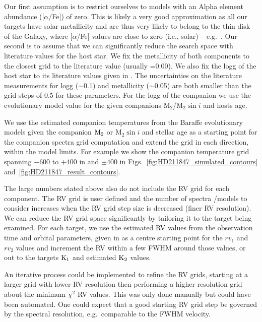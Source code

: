 Our first assumption is to restrict ourselves to models with an Alpha element abundance ([\(\alpha\)/Fe]) of zero. This is likely a very good approximation as all our targets have solar metallicity and are thus very likely to belong to the thin disk of the Galaxy, where [\(\alpha\)/Fe] values are close to zero (i.e., solar) -- e.g.~\citet{adibekyan_chemical_2012}. Our second is to assume that we can significantly reduce the search space with literature values for the host star. We fix the metallicity of both components to the closest grid to the literature value (usually \feh{}=0.00). We also fix the logg of the host star to its literature values given in . The uncertainties on the literature measurements for logg (\(\sim\)0.1) and metallicity (\(\sim\)0.05) are both smaller than the grid steps of 0.5 for these parameters.
For the logg of the companion we use the~\citet{baraffe_evolutionary_2003,baraffe_new_2015} evolutionary model value for the given companions \(\textrm{M}_2\)/\(\textrm{M}_2\sin{i}\) and hosts age.

We use the estimated companion temperatures from the Baraffe evolutionary models given the companion \(\rm M_2\) or \(\textrm{M}_2\sin{i}\) and stellar age as a starting point for the companion spectra grid computation and extend the grid in each direction, within the model limits. For example we show the companion temperature grid spanning \(-600\) to \(+400\)\K{} in  and \(\pm400\)\K{} in Figs.~\ref{fig:HD211847_simulated_contours} and~\ref{fig:HD211847_result_contours}.

The large numbers stated above also do not include the {RV} grid for each component. The {RV} grid is user defined and the number of spectra /models to consider increases when the {RV} grid step size is decreased (finer {RV} resolution). We can reduce the {RV} grid space significantly by tailoring it to the target being examined. For each target, we use the estimated {RV} values from the observation time and orbital parameters, given in  as a centre starting point for the \({rv}_1\) and \({rv}_2\) values and increment the {RV} within a few {FWHM} around those values, or out to the targets \(\rm K_1\) and estimated \(\rm K_2\) values.

An iterative process could be implemented to refine the {RV} grids, starting at a larger grid with lower {RV} resolution then performing a higher resolution grid about the minimum \(\chi^2\) {RV} values. This was only done manually but could have been automated. One could expect that a good starting {RV} grid step be governed by the spectral resolution, e.g.\ comparable to the {FWHM} velocity.

